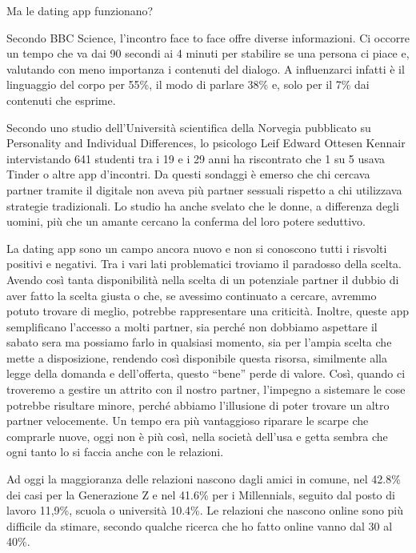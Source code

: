 \documentclass[12pt]{book} %
\begin{document}
\begin{mdframed}[linewidth=1pt]
\bigskip

Ma le dating app funzionano?

Secondo BBC Science, l'incontro face to face offre
diverse informazioni. Ci occorre un tempo che va dai 90 secondi ai 4 minuti per stabilire se una persona ci piace e,
valutando con meno importanza i contenuti del dialogo. A influenzarci infatti è il linguaggio del corpo per 55\%, il
modo di parlare 38\% e, solo per il 7\% dai contenuti che esprime. 


\bigskip

Secondo uno studio dell'Università scientifica della Norvegia pubblicato su Personality and Individual Differences, lo
psicologo Leif Edward Ottesen Kennair intervistando 641 studenti tra i 19 e i 29 anni ha riscontrato che 1 su 5 usava
Tinder o altre app d'incontri. Da questi sondaggi è emerso che chi cercava partner tramite il digitale non aveva più
partner sessuali rispetto a chi utilizzava strategie tradizionali. Lo studio ha anche svelato che le donne, a
differenza degli uomini, più che un amante cercano la conferma del loro potere seduttivo.

La dating app sono un campo ancora nuovo e non si conoscono tutti i risvolti positivi e negativi. Tra i vari lati
problematici troviamo il paradosso della scelta. Avendo così tanta disponibilità nella scelta di un potenziale partner
il dubbio di aver fatto la scelta giusta o che, se avessimo continuato a cercare, avremmo potuto trovare di meglio,
potrebbe rappresentare una criticità. Inoltre, queste app semplificano l'accesso a molti partner,
sia perché non dobbiamo aspettare il sabato sera ma possiamo farlo in qualsiasi momento, sia per
l'ampia scelta che mette a disposizione, rendendo così disponibile questa risorsa, similmente alla
legge della domanda e dell'offerta, questo “bene” perde di valore. Così, quando ci troveremo a
gestire un attrito con il nostro partner, l'impegno a sistemare le cose potrebbe risultare minore,
perché abbiamo l'illusione di poter trovare un altro partner velocemente. Un tempo era più
vantaggioso riparare le scarpe che comprarle nuove, oggi non è più così, nella società dell'usa e
getta sembra che ogni tanto lo si faccia anche con le relazioni.

Ad oggi la maggioranza delle relazioni nascono dagli amici in comune, nel 42.8\% dei casi per la Generazione Z e nel
41.6\% per i Millennials, seguito dal posto di lavoro 11,9\%, scuola o università 10.4\%. Le relazioni che nascono
online sono più difficile da stimare, secondo qualche ricerca che ho fatto online vanno dal 30 al
40\%.
\end{mdframed}
\end{document}
